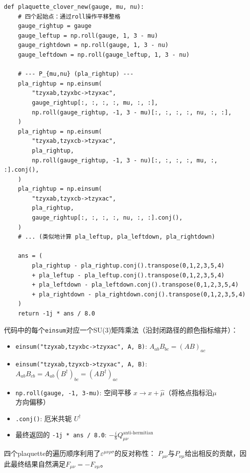 \documentclass[12pt,a4paper]{ctexart}
\begin{document}
\begin{codebox}
\begin{lstlisting}[style=pythonstyle]
def plaquette_clover_new(gauge, mu, nu):
    # 四个起始点：通过roll操作平移整格
    gauge_rightup = gauge
    gauge_leftup = np.roll(gauge, 1, 3 - mu)
    gauge_rightdown = np.roll(gauge, 1, 3 - nu)
    gauge_leftdown = np.roll(gauge_leftup, 1, 3 - nu)

    # --- P_{mu,nu} (pla_rightup) ---
    pla_rightup = np.einsum(
        "tzyxab,tzyxbc->tzyxac",
        gauge_rightup[:, :, :, :, mu, :, :],
        np.roll(gauge_rightup, -1, 3 - mu)[:, :, :, :, nu, :, :],
    )
    pla_rightup = np.einsum(
        "tzyxab,tzyxcb->tzyxac",
        pla_rightup,
        np.roll(gauge_rightup, -1, 3 - nu)[:, :, :, :, mu, :, :].conj(),
    )
    pla_rightup = np.einsum(
        "tzyxab,tzyxcb->tzyxac",
        pla_rightup,
        gauge_rightup[:, :, :, :, nu, :, :].conj(),
    )
    # ... (类似地计算 pla_leftup, pla_leftdown, pla_rightdown)

    ans = (
        pla_rightup - pla_rightup.conj().transpose(0,1,2,3,5,4)
        + pla_leftup - pla_leftup.conj().transpose(0,1,2,3,5,4)
        + pla_leftdown - pla_leftdown.conj().transpose(0,1,2,3,5,4)
        + pla_rightdown - pla_rightdown.conj().transpose(0,1,2,3,5,4)
    )
    return -1j * ans / 8.0
\end{lstlisting}
\end{codebox}

\begin{physbox}
代码中的每个\texttt{einsum}对应一个SU(3)矩阵乘法（沿封闭路径的颜色指标缩并）：

\begin{itemize}
    \item \texttt{einsum("tzyxab,tzyxbc->tzyxac", A, B)}: $A_{ab} B_{bc} = (AB)_{ac}$
    \item \texttt{einsum("tzyxab,tzyxcb->tzyxac", A, B)}: $A_{ab} B_{cb} = A_{ab} (B^\dagger)_{bc} = (AB^\dagger)_{ac}$
    \item \texttt{np.roll(gauge, -1, 3-mu)}: 空间平移 $x \to x+\hat{\mu}$（将格点指标沿$\mu$方向偏移）
    \item \texttt{.conj()}: 厄米共轭 $U^\dagger$
    \item 最终返回的 \texttt{-1j * ans / 8.0}: $-\frac{i}{8} Q_{\mu\nu}^{\text{anti-hermitian}}$
\end{itemize}

四个plaquette的遍历顺序利用了$\varepsilon^{\mu\nu\rho\sigma}$的反对称性：
$P_{\mu\nu}$与$P_{\nu\mu}$给出相反的贡献，因此最终结果自然满足$F_{\mu\nu} = -F_{\nu\mu}$。
\end{physbox}
\end{document}
